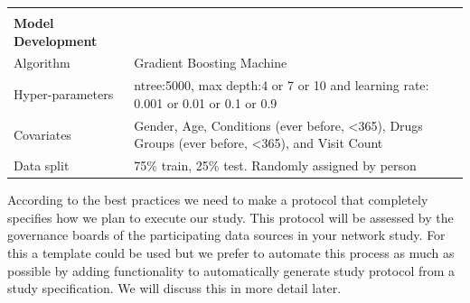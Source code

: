\documentclass[
]{article}
\begin{document}
\begin{longtable}[]{@{}ll@{}}
\begin{minipage}[t]{0.52\columnwidth}
\strut
\end{minipage}\tabularnewline
\begin{minipage}[t]{0.42\columnwidth}\raggedright
\textbf{Model Development}\strut
\end{minipage} & \begin{minipage}[t]{0.52\columnwidth}\raggedright
\strut
\end{minipage}\tabularnewline
\begin{minipage}[t]{0.42\columnwidth}\raggedright
Algorithm\strut
\end{minipage} & \begin{minipage}[t]{0.52\columnwidth}\raggedright
Gradient Boosting Machine\strut
\end{minipage}\tabularnewline
\begin{minipage}[t]{0.42\columnwidth}\raggedright
Hyper-parameters\strut
\end{minipage} & \begin{minipage}[t]{0.52\columnwidth}\raggedright
ntree:5000, max depth:4 or 7 or 10 and learning rate: 0.001 or 0.01 or
0.1 or 0.9\strut
\end{minipage}\tabularnewline
\begin{minipage}[t]{0.42\columnwidth}\raggedright
Covariates\strut
\end{minipage} & \begin{minipage}[t]{0.52\columnwidth}\raggedright
Gender, Age, Conditions (ever before, \textless365), Drugs Groups (ever
before, \textless365), and Visit Count\strut
\end{minipage}\tabularnewline
\begin{minipage}[t]{0.42\columnwidth}\raggedright
Data split\strut
\end{minipage} & \begin{minipage}[t]{0.52\columnwidth}\raggedright
75\% train, 25\% test. Randomly assigned by person\strut
\end{minipage}\tabularnewline
\bottomrule
\end{longtable}

According to the best practices we need to make a protocol that
completely specifies how we plan to execute our study. This protocol
will be assessed by the governance boards of the participating data
sources in your network study. For this a template could be used but we
prefer to automate this process as much as possible by adding
functionality to automatically generate study protocol from a study
specification. We will discuss this in more detail later.
\end{document}
